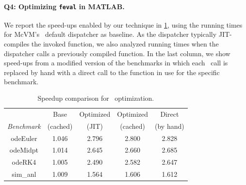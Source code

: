 \begin{description}
\paragraph{Q4: Optimizing {\tt feval} in MATLAB.}
We report the speed-ups enabled by our technique in \mytable\ref{tab:feval}, using the running times for McVM's \feval\ default dispatcher as baseline. As the dispatcher typically JIT-compiles the invoked function, we also analyzed running times when the dispatcher calls a previously compiled function. In the last column, we show speed-ups from a modified version of the benchmarks in which each \feval\ call is replaced by hand with a direct call to the function in use for the specific benchmark.

\begin{table}[hb]
\begin{small}
    \begin{tabular}{ |c|c|c|c|c| }
        \cline{2-5}
        \multicolumn{1}{c|}{} & Base & Optimized & Optimized & Direct \\ 
        \cline{1-1}
        {\em Benchmark} & (cached) & (JIT) & (cached) & (by hand) \\
        \hline
        \hline
        odeEuler & 1.046 & 2.796 & 2.800 & 2.828 \\ 
        \hline
        odeMidpt & 1.014 & 2.645 & 2.660 & 2.685 \\ 
        \hline
        odeRK4 & 1.005 & 2.490 & 2.582 & 2.647 \\ 
        \hline
        sim\_anl & 1.009 & 1.564 & 1.606 & 1.612 \\ 
        \hline
    \end{tabular} 
    \caption{\label{tab:feval} Speedup comparison for \feval\ optimization.} 
\end{small}
\end{table}


\end{description}
